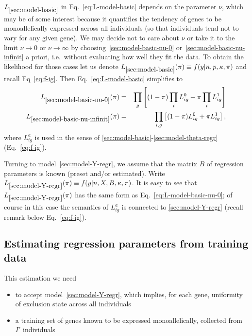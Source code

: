\documentclass[letterpaper]{article}
\begin{document}
\(L_{\ref{sec:model-basic}}\) in Eq.~\ref{eq:L-model-basic} depends on the parameter \(\nu\), which
may be of some interest because it quantifies the tendency of genes to be
monoallelically expressed across all individuals (so that individuals tend not
to vary for any given gene).  We may decide not to care about \(\nu\) or take
it to the limit \(\nu\rightarrow 0\) or \(\nu\rightarrow \infty\) by
choosing~\ref{sec:model-basic-nu-0} or~\ref{sec:model-basic-nu-infinit} a
priori, i.e.~without evaluating how well they fit the data.  To obtain the
likelihood for those cases let us denote \(L_{\ref{sec:model-basic}}(\pi)\equiv
f(y|n,p,\kappa,\pi)\) and recall Eq~\ref{eq:f-ig}.  Then
Eq.~\ref{eq:L-model-basic} simplifies to
\begin{eqnarray}
\label{eq:L-model-basic-nu-0}
L_{\ref{sec:model-basic-nu-0}}(\pi) &=&
\prod_{g}
\left[
(1-\pi) \prod_i L_{ig}^0 + \pi \prod_i L_{ig}^1
\right]
\\
\label{eq:L-model-basic-nu-infinit}
L_{\ref{sec:model-basic-nu-infinit}}(\pi) &=&
\prod_{i,g}
\left[
(1-\pi) L_{ig}^0 + \pi L_{ig}^1
\right],
\end{eqnarray}
where \(L_{ig}^a\) is used in the sense of
\ref{sec:model-basic}-\ref{sec:model-theta-regr} (Eq.~\ref{eq:f-ig}).

Turning to model~\ref{sec:model-Y-regr}, we assume that the matrix \(B\) of regression
parameters is known
(preset and/or estimated).  Write \(L_{\ref{sec:model-Y-regr}}(\pi)\equiv
f(y|n,X,B,\kappa,\pi)\).  It is easy to see that
\(L_{\ref{sec:model-Y-regr}}(\pi)\) has the same form as
Eq.~\ref{eq:L-model-basic-nu-0}; of course in this case the semantics of \(L_{ig}^a\)
is connected to \ref{sec:model-Y-regr} (recall remark below Eq.~\ref{eq:f-ig}).

\subsection{Estimating regression parameters from training data}
\label{sec:beta-from-training-data}

This estimation we need
\begin{itemize}
\item to accept model~\ref{sec:model-Y-regr}, which implies, for each gene,
uniformity of exclusion state across all individuals
\item a training set of genes known to be expressed monoallelically, collected
from \(I'\) individuals
\end{itemize}
\end{document}
